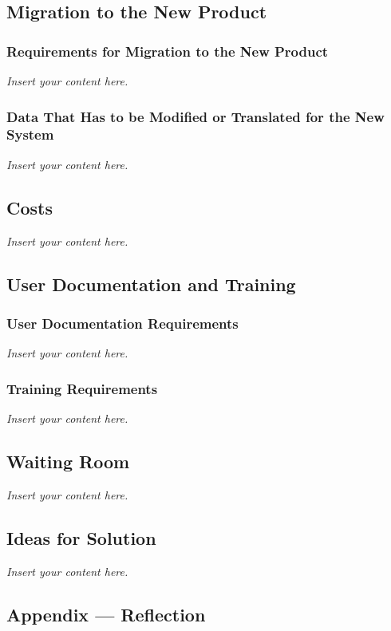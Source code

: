 \documentclass[12pt]{article}
\newcommand{\lips}{\textit{Insert your content here.}}
\begin{document}
\subsection{Migration to the New Product}
\subsubsection{Requirements for Migration to the New Product}
\lips
\subsubsection{Data That Has to be Modified or Translated for the New System}
\lips

\subsection{Costs}
\lips
\subsection{User Documentation and Training}
\subsubsection{User Documentation Requirements}
\lips
\subsubsection{Training Requirements}
\lips

\subsection{Waiting Room}
\lips

\subsection{Ideas for Solution}
\lips

\newpage{}
\subsection*{Appendix --- Reflection}




\end{document}
